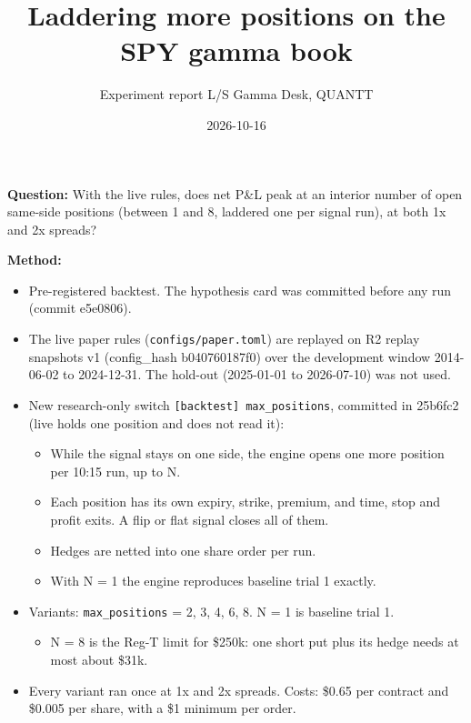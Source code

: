 \documentclass{article}
\title{Laddering more positions on the SPY gamma book}
\author{Experiment report \textperiodcentered{} L/S Gamma Desk, QUANTT}
\date{2026-10-16}
\begin{document}
\maketitle

\textbf{Question:} With the live rules, does net P\&L peak at an interior number of open same-side positions (between 1 and 8, laddered one per signal run), at both 1x and 2x spreads?

\textbf{Method:}

\begin{itemize}

\item Pre-registered backtest. The hypothesis card was committed before any run (commit e5e0806).

\item The live paper rules (\texttt{configs/\allowbreak{}paper.\allowbreak{}toml}) are replayed on R2 replay snapshots v1 (config\_hash b040760187f0) over the development window 2014-06-02 to 2024-12-31. The hold-out (2025-01-01 to 2026-07-10) was not used.

\item New research-only switch \texttt{[backtest] max\_\allowbreak{}positions}, committed in 25b6fc2 (live holds one position and does not read it):

\begin{itemize}

\item While the signal stays on one side, the engine opens one more position per 10:15 run, up to N.

\item Each position has its own expiry, strike, premium, and time, stop and profit exits. A flip or flat signal closes all of them.

\item Hedges are netted into one share order per run.

\item With N = 1 the engine reproduces baseline trial 1 exactly.

\end{itemize}

\item Variants: \texttt{max\_\allowbreak{}positions} = 2, 3, 4, 6, 8. N = 1 is baseline trial 1.

\begin{itemize}

\item N = 8 is the Reg-T limit for \$250k: one short put plus its hedge needs at most about \$31k.

\end{itemize}

\item Every variant ran once at 1x and 2x spreads. Costs: \$0.65 per contract and \$0.005 per share, with a \$1 minimum per order.

\end{itemize}
\end{document}

